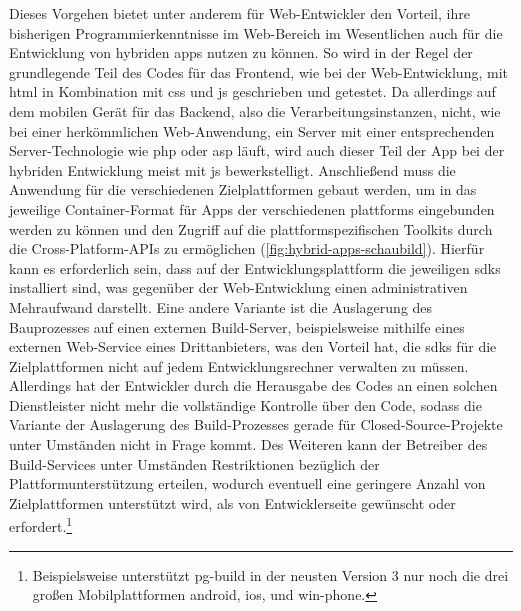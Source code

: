 Dieses Vorgehen bietet unter anderem für Web-Entwickler den Vorteil, ihre bisherigen Programmierkenntnisse im Web-Bereich im Wesentlichen auch für die Entwicklung von hybriden \glspl{app} nutzen zu können. 
So wird in der Regel der grundlegende Teil des Codes für das Frontend, wie bei der Web-Entwicklung, mit \gls{html} in Kombination mit \gls{css} und \gls{js} geschrieben und getestet. 
Da allerdings auf dem mobilen Gerät für das Backend, also die Verarbeitungsinstanzen, nicht, wie bei einer herkömmlichen Web-Anwendung, ein Server mit einer entsprechenden Server-Technologie wie \gls{php} oder \gls{asp} läuft, wird auch dieser Teil der App bei der hybriden Entwicklung meist mit \gls{js} bewerkstelligt. 
Anschließend muss die Anwendung für die verschiedenen Zielplattformen gebaut werden, um in das jeweilige Container-Format für Apps der verschiedenen \glspl{plattform} eingebunden werden zu können und den Zugriff auf die plattformspezifischen Toolkits durch die Cross-Platform-APIs zu ermöglichen (\autoref{fig:hybrid-apps-schaubild}).
Hierfür kann es erforderlich sein, dass auf der Entwicklungsplattform die jeweiligen \glspl{sdk} installiert sind, was gegenüber der Web-Entwicklung einen administrativen Mehraufwand darstellt.
Eine andere Variante ist die Auslagerung des Bauprozesses auf einen externen Build-Server, beispielsweise mithilfe eines externen Web-Service eines Drittanbieters, was den Vorteil hat, die \glspl{sdk} für die Zielplattformen nicht auf jedem Entwicklungsrechner verwalten zu müssen. 
Allerdings hat der Entwickler durch die Herausgabe des Codes an einen solchen Dienstleister nicht mehr die vollständige Kontrolle über den Code, sodass die Variante der Auslagerung des Build-Prozesses gerade für Closed-Source-Projekte unter Umständen nicht in Frage kommt. 
Des Weiteren kann der Betreiber des Build-Services unter Umständen Restriktionen bezüglich der Plattformunterstützung erteilen, wodurch eventuell eine geringere Anzahl von Zielplattformen unterstützt wird, als von Entwicklerseite gewünscht oder erfordert.\footnote{Beispielsweise unterstützt \gls{pg-build} in der neusten Version 3 nur noch die drei großen Mobilplattformen \gls{android}, \gls{ios}, und \gls{win-phone}.}

